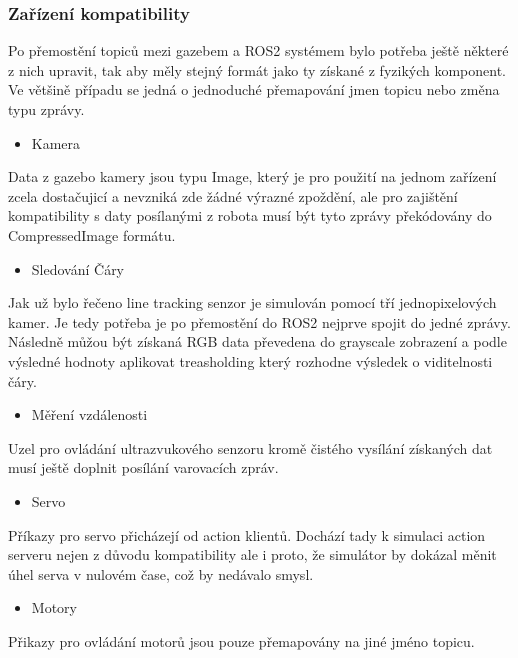 \subsubsection*{Zařízení kompatibility}
Po přemostění topiců mezi gazebem a ROS2 systémem bylo potřeba ještě některé z nich upravit, tak aby měly stejný formát jako ty získané z fyzikých komponent. Ve většině případu se jedná o jednoduché přemapování jmen topicu nebo změna typu zprávy.

\begin{itemize}[leftmargin=*]
	\item{Kamera}
\end{itemize}
\vspace*{-0.5em}
Data z gazebo kamery jsou typu Image, který je pro použití na jednom zařízení zcela dostačujicí a nevzniká zde žádné výrazné zpoždění, ale pro zajištění kompatibility s daty posílanými z robota musí být tyto zprávy překódovány do CompressedImage formátu.

\begin{itemize}[leftmargin=*]
	\item{Sledování Čáry}
\end{itemize}
\vspace*{-0.5em}
Jak už bylo řečeno line tracking senzor je simulován pomocí tří jednopixelových kamer. Je tedy potřeba je po přemostění do ROS2 nejprve spojit do jedné zprávy. Následně můžou být získaná RGB data převedena do grayscale zobrazení a podle výsledné hodnoty aplikovat treasholding který rozhodne výsledek o viditelnosti čáry.

\begin{itemize}[leftmargin=*]
	\item{Měření vzdálenosti}
\end{itemize}
\vspace*{-0.5em}
Uzel pro ovládání ultrazvukového senzoru kromě čistého vysílání získaných dat musí ještě doplnit posílání varovacích zpráv.

\begin{itemize}[leftmargin=*]
	\item{Servo}
\end{itemize}
\vspace*{-0.5em}
Příkazy pro servo přicházejí od action klientů. Dochází tady k simulaci action serveru nejen z důvodu kompatibility ale i proto, že simulátor by dokázal měnit úhel serva v nulovém čase, což by nedávalo smysl.

\begin{itemize}[leftmargin=*]
	\item{Motory}
\end{itemize}
\vspace*{-0.5em}
Přikazy pro ovládání motorů jsou pouze přemapovány na jiné jméno topicu.

